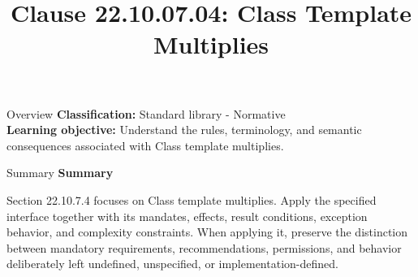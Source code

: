 \documentclass[10pt,letterpaper]{article}
\title{Clause 22.10.07.04: Class Template Multiplies}
\author{}
\date{}
\begin{document}
\maketitle
\begin{CornellOverviewBox}{Overview}
\textbf{Classification:} Standard library - Normative\\[2pt]
\textbf{Learning objective:} Understand the rules, terminology, and semantic consequences associated with Class template multiplies.
\end{CornellOverviewBox}\begin{CornellSummaryBox}{Summary}
{\sffamily\bfseries\color{Accent} Summary}\par\vspace{3pt}Section 22.10.7.4 focuses on Class template multiplies. Apply the specified interface together with its mandates, effects, result conditions, exception behavior, and complexity constraints. When applying it, preserve the distinction between mandatory requirements, recommendations, permissions, and behavior deliberately left undefined, unspecified, or implementation-defined.
\end{CornellSummaryBox}
\end{document}
